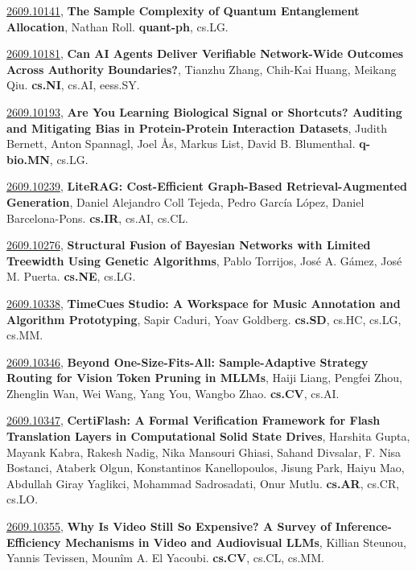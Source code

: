 \documentclass[9pt, a4paper]{article}
\theoremstyle{plain}
\theoremstyle{definition}
\theoremstyle{remark}
\newcommand{\arxivwithtarget}[3]{\hypertarget{#1}{}\href{https://arxiv.org/abs/#1}{#1}, \textbf{\textcolor{arxivblue}{#2}}, #3. }
\begin{document}
\arxivwithtarget{2609.10141}{The Sample Complexity of Quantum Entanglement Allocation}{Nathan Roll}\textbf{quant-ph}, cs.LG.



\arxivwithtarget{2609.10181}{Can AI Agents Deliver Verifiable Network-Wide Outcomes Across Authority Boundaries?}{Tianzhu Zhang, Chih-Kai Huang, Meikang Qiu}\textbf{cs.NI}, cs.AI, eess.SY.



\arxivwithtarget{2609.10193}{Are You Learning Biological Signal or Shortcuts? Auditing and Mitigating Bias in Protein-Protein Interaction Datasets}{Judith Bernett, Anton Spannagl, Joel Ås, Markus List, David B. Blumenthal}\textbf{q-bio.MN}, cs.LG.



\arxivwithtarget{2609.10239}{LiteRAG: Cost-Efficient Graph-Based Retrieval-Augmented Generation}{Daniel Alejandro Coll Tejeda, Pedro García López, Daniel Barcelona-Pons}\textbf{cs.IR}, cs.AI, cs.CL.



\arxivwithtarget{2609.10276}{Structural Fusion of Bayesian Networks with Limited Treewidth Using Genetic Algorithms}{Pablo Torrijos, José A. Gámez, José M. Puerta}\textbf{cs.NE}, cs.LG.



\arxivwithtarget{2609.10338}{TimeCues Studio: A Workspace for Music Annotation and Algorithm Prototyping}{Sapir Caduri, Yoav Goldberg}\textbf{cs.SD}, cs.HC, cs.LG, cs.MM.



\arxivwithtarget{2609.10346}{Beyond One-Size-Fits-All: Sample-Adaptive Strategy Routing for Vision Token Pruning in MLLMs}{Haiji Liang, Pengfei Zhou, Zhenglin Wan, Wei Wang, Yang You, Wangbo Zhao}\textbf{cs.CV}, cs.AI.



\arxivwithtarget{2609.10347}{CertiFlash: A Formal Verification Framework for Flash Translation Layers in Computational Solid State Drives}{Harshita Gupta, Mayank Kabra, Rakesh Nadig, Nika Mansouri Ghiasi, Sahand Divsalar, F. Nisa Bostanci, Ataberk Olgun, Konstantinos Kanellopoulos, Jisung Park, Haiyu Mao, Abdullah Giray Yaglikci, Mohammad Sadrosadati, Onur Mutlu}\textbf{cs.AR}, cs.CR, cs.LO.



\arxivwithtarget{2609.10355}{Why Is Video Still So Expensive? A Survey of Inference-Efficiency Mechanisms in Video and Audiovisual LLMs}{Killian Steunou, Yannis Tevissen, Mounîm A. El Yacoubi}\textbf{cs.CV}, cs.CL, cs.MM.
\end{document}
